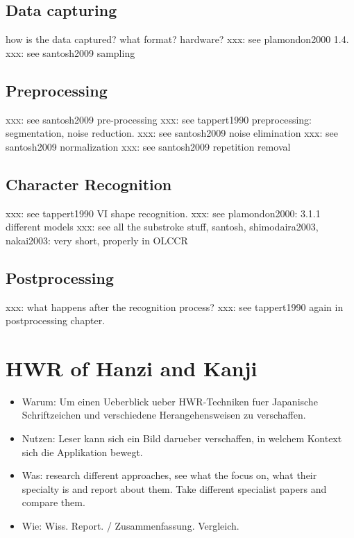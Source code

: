 \subsection{Data capturing}
\label{sec:datacapturing}

how is the data captured? what format?
hardware?
xxx: see plamondon2000 1.4.
xxx: see santosh2009 sampling

\subsection{Preprocessing}
\label{sec:preprocessing}

xxx: see santosh2009 pre-processing
xxx: see tappert1990 preprocessing: segmentation, noise reduction.
xxx: see santosh2009 noise elimination
xxx: see santosh2009 normalization
xxx: see santosh2009 repetition removal

\subsection{Character Recognition}
\label{sec:characterrecognition}

xxx: see tappert1990 VI shape recognition.
xxx: see plamondon2000: 3.1.1 different models
xxx: see all the substroke stuff, santosh, shimodaira2003, nakai2003: very short, properly in OLCCR

\subsection{Postprocessing}
\label{sec:postprocessing}

xxx: what happens after the recognition process?
xxx: see tappert1990 again in postprocessing chapter.

\section{HWR of Hanzi and Kanji}
\begin{itemize}
\item Warum: Um einen Ueberblick ueber HWR-Techniken fuer Japanische 
  Schriftzeichen und verschiedene Herangehensweisen zu verschaffen.
\item Nutzen: Leser kann sich ein Bild darueber verschaffen,
  in welchem Kontext sich die Applikation bewegt.
\item Was: research different approaches, see what the focus on, 
  what their specialty is and report about them. Take different specialist 
  papers and compare them.
\item Wie: Wiss. Report. / Zusammenfassung. Vergleich. 
\end{itemize}

